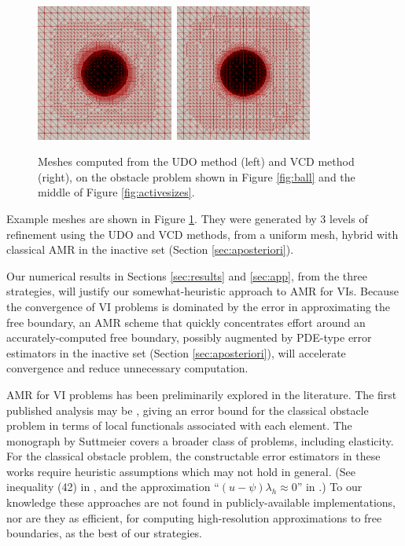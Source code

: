 \documentclass[]{interact}
\theoremstyle{plain}%
\theoremstyle{definition}
\theoremstyle{remark}
\begin{document}
\begin{figure}[ht]
\centering
\mbox{\includegraphics[width=0.4\textwidth]{static/sphereudo.png} \qquad
\includegraphics[width=0.4\textwidth]{static/spherevcd.png}}
\caption{Meshes computed from the UDO method (left) and VCD method (right), on the obstacle problem shown in Figure \ref{fig:ball} and the middle of Figure \ref{fig:activesizes}.}
\label{fig:udovcdmeshes}
\end{figure}

Example meshes are shown in Figure \ref{fig:udovcdmeshes}.  They were generated by 3 levels of refinement using the UDO and VCD methods, from a uniform mesh, hybrid with classical AMR in the inactive set (Section \ref{sec:aposteriori}).

Our numerical results in Sections \ref{sec:results} and \ref{sec:app}, from the three strategies, will justify our somewhat-heuristic approach to AMR for VIs.  Because the convergence of VI problems is dominated by the error in approximating the free boundary, an AMR scheme that quickly concentrates effort around an accurately-computed free boundary, possibly augmented by PDE-type error estimators in the inactive set (Section \ref{sec:aposteriori}), will accelerate convergence and reduce unnecessary computation.

AMR for VI problems has been preliminarily explored in the literature.  The first published analysis may be \cite{AinsworthOdenLee1993}, giving an error bound for the classical obstacle problem in terms of local functionals associated with each element.  The monograph by Suttmeier \cite{Suttmeier2008} covers a broader class of problems, including elasticity.  For the classical obstacle problem, the constructable error estimators in these works require heuristic assumptions which may not hold in general.  (See inequality (42) in \cite{AinsworthOdenLee1993}, and the approximation ``$(u-\psi)\lambda_h\approx 0$'' in \cite{Suttmeier2008}.)  To our knowledge these approaches are not found in publicly-available implementations, nor are they as efficient, for computing high-resolution approximations to free boundaries, as the best of our strategies.
\end{document}
